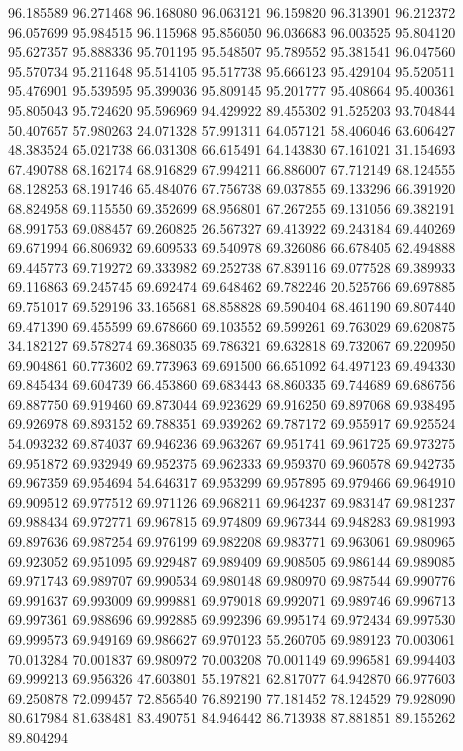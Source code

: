 96.185589
96.271468
96.168080
96.063121
96.159820
96.313901
96.212372
96.057699
95.984515
96.115968
95.856050
96.036683
96.003525
95.804120
95.627357
95.888336
95.701195
95.548507
95.789552
95.381541
96.047560
95.570734
95.211648
95.514105
95.517738
95.666123
95.429104
95.520511
95.476901
95.539595
95.399036
95.809145
95.201777
95.408664
95.400361
95.805043
95.724620
95.596969
94.429922
89.455302
91.525203
93.704844
50.407657
57.980263
24.071328
57.991311
64.057121
58.406046
63.606427
48.383524
65.021738
66.031308
66.615491
64.143830
67.161021
31.154693
67.490788
68.162174
68.916829
67.994211
66.886007
67.712149
68.124555
68.128253
68.191746
65.484076
67.756738
69.037855
69.133296
66.391920
68.824958
69.115550
69.352699
68.956801
67.267255
69.131056
69.382191
68.991753
69.088457
69.260825
26.567327
69.413922
69.243184
69.440269
69.671994
66.806932
69.609533
69.540978
69.326086
66.678405
62.494888
69.445773
69.719272
69.333982
69.252738
67.839116
69.077528
69.389933
69.116863
69.245745
69.692474
69.648462
69.782246
20.525766
69.697885
69.751017
69.529196
33.165681
68.858828
69.590404
68.461190
69.807440
69.471390
69.455599
69.678660
69.103552
69.599261
69.763029
69.620875
34.182127
69.578274
69.368035
69.786321
69.632818
69.732067
69.220950
69.904861
60.773602
69.773963
69.691500
66.651092
64.497123
69.494330
69.845434
69.604739
66.453860
69.683443
68.860335
69.744689
69.686756
69.887750
69.919460
69.873044
69.923629
69.916250
69.897068
69.938495
69.926978
69.893152
69.788351
69.939262
69.787172
69.955917
69.925524
54.093232
69.874037
69.946236
69.963267
69.951741
69.961725
69.973275
69.951872
69.932949
69.952375
69.962333
69.959370
69.960578
69.942735
69.967359
69.954694
54.646317
69.953299
69.957895
69.979466
69.964910
69.909512
69.977512
69.971126
69.968211
69.964237
69.983147
69.981237
69.988434
69.972771
69.967815
69.974809
69.967344
69.948283
69.981993
69.897636
69.987254
69.976199
69.982208
69.983771
69.963061
69.980965
69.923052
69.951095
69.929487
69.989409
69.908505
69.986144
69.989085
69.971743
69.989707
69.990534
69.980148
69.980970
69.987544
69.990776
69.991637
69.993009
69.999881
69.979018
69.992071
69.989746
69.996713
69.997361
69.988696
69.992885
69.992396
69.995174
69.972434
69.997530
69.999573
69.949169
69.986627
69.970123
55.260705
69.989123
70.003061
70.013284
70.001837
69.980972
70.003208
70.001149
69.996581
69.994403
69.999213
69.956326
47.603801
55.197821
62.817077
64.942870
66.977603
69.250878
72.099457
72.856540
76.892190
77.181452
78.124529
79.928090
80.617984
81.638481
83.490751
84.946442
86.713938
87.881851
89.155262
89.804294
